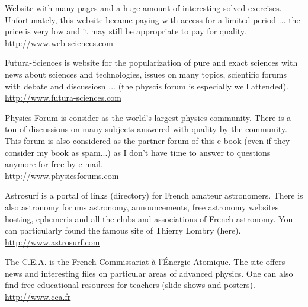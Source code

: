 	{\Large {}}{\Large {}}{\Large {}}{\Large {}}\bcdfrance{} Website with many pages and a huge amount of interesting solved exercises. Unfortunately, this website became paying with access for a limited period ... the price is very low and it may still be appropriate to pay for quality.\\
	\href{http://www.web-sciences.com}{\color{blue}http://www.web-sciences.com}
	
	{\Large {}}{\Large {}}{\Large {}}{\Large {}}{\Large {}}\bcdfrance{} Futura-Sciences is website for the popularization of pure and exact sciences with news about sciences and technologies, issues on many topics, scientific forums with debate and discussiosn ... (the physcis forum is especially well attended).\\
	\href{http://www.futura-sciences.com}{\color{blue}http://www.futura-sciences.com}
	
	{\Large {}}{\Large {}}{\Large {}}{\Large {}}{\Large {}}\bcdfrance{} Physics Forum is consider as the world's largest physics community. There is a ton of discussions on many subjects answered with quality by the community. This forum is also considered as the partner forum of this e-book (even if they consider my book as spam...) as I don't have time to answer to questions anymore for free by e-mail. \\
	\href{http://www.physicsforums.com}{\color{blue}http://www.physicsforums.com}
	
	{\Large {}}{\Large {}}{\Large {}}{\Large {}}{\Large {}}{\Large {}}{\Large {}}{\Large {}}\bcdfrance{} Astrosurf is a portal of links (directory) for French amateur astronomers. There is also astronomy forums astronomy, announcements, free astronomy websites hosting, ephemeris and all the clubs and associations of French astronomy. You can particularly found the famous site of Thierry Lombry (here).\\
	\href{http://www.astrosurf.com}{\color{blue}http://www.astrosurf.com}
	
	{\Large {}}{\Large {}} The C.E.A. is the French Commissariat à l'Énergie Atomique. The site offers news and interesting files on particular areas of advanced physics. One can also find free educational resources for teachers (slide shows and posters).\\
	\href{http://www.cea.fr}{\color{blue}http://www.cea.fr}
	
